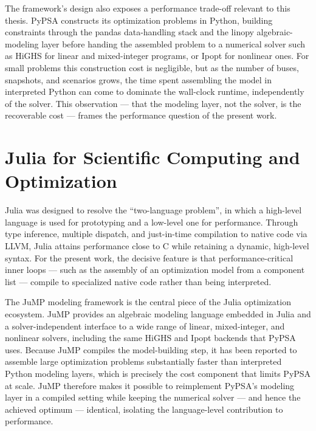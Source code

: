 The framework's design also exposes a performance trade-off relevant to this thesis. PyPSA constructs its optimization problems in Python, building constraints through the pandas data-handling stack and the linopy algebraic-modeling layer \cite{hofmann2023linopy} before handing the assembled problem to a numerical solver such as HiGHS \cite{huangfu2018highs} for linear and mixed-integer programs, or Ipopt \cite{wachter2006ipopt} for nonlinear ones. For small problems this construction cost is negligible, but as the number of buses, snapshots, and scenarios grows, the time spent assembling the model in interpreted Python can come to dominate the wall-clock runtime, independently of the solver. This observation --- that the modeling layer, not the solver, is the recoverable cost --- frames the performance question of the present work.

\section{Julia for Scientific Computing and Optimization}

Julia \cite{bezanson2017julia} was designed to resolve the ``two-language problem'', in which a high-level language is used for prototyping and a low-level one for performance. Through type inference, multiple dispatch, and just-in-time compilation to native code via LLVM, Julia attains performance close to C while retaining a dynamic, high-level syntax. For the present work, the decisive feature is that performance-critical inner loops --- such as the assembly of an optimization model from a component list --- compile to specialized native code rather than being interpreted.

The JuMP modeling framework \cite{dunning2017jump,lubin2023jump} is the central piece of the Julia optimization ecosystem. JuMP provides an algebraic modeling language embedded in Julia and a solver-independent interface to a wide range of linear, mixed-integer, and nonlinear solvers, including the same HiGHS and Ipopt backends that PyPSA uses. Because JuMP compiles the model-building step, it has been reported to assemble large optimization problems substantially faster than interpreted Python modeling layers, which is precisely the cost component that limits PyPSA at scale. JuMP therefore makes it possible to reimplement PyPSA's modeling layer in a compiled setting while keeping the numerical solver --- and hence the achieved optimum --- identical, isolating the language-level contribution to performance.


